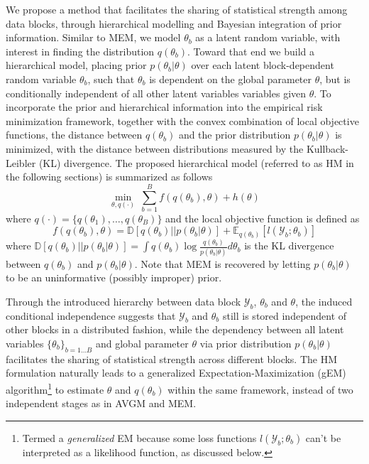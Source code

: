 \documentclass{article}
\newcommand{\1}[0]{\ensuremath{\boldsymbol{1}}\xspace}
\begin{document}

We propose a method that facilitates the sharing of statistical strength among data blocks, through hierarchical modelling and Bayesian integration of prior information. Similar to MEM, we model $\theta_b$ as a latent random variable, with interest in finding the distribution $q(\theta_b)$. Toward that end we build a hierarchical model, placing prior $p(\theta_b | \theta)$ over each latent block-dependent random variable $\theta_b$, such that $\theta_b$ is dependent on the global parameter $\theta$, but is conditionally independent of all other latent variables variables given $\theta$. To incorporate the prior and hierarchical information into the empirical risk minimization framework, together with the convex combination of local objective functions, the distance between $q(\theta_b)$ and the prior distribution $p(\theta_b|\theta)$ is minimized, with the distance between distributions measured by the Kullback-Leibler (KL) divergence. The proposed hierarchical model (referred to as HM in the following sections) is summarized as follows
\begin{equation}\label{hm}
\textstyle \min_{\theta, q(\cdot)} ~ \sum_{b=1}^B f(q(\theta_b), \theta) + h(\theta)
\end{equation}
where $q(\cdot) = \{q(\theta_1), \ldots, q(\theta_B)\}$ and the local objective function is defined as
\begin{equation}\label{local_obj}
\textstyle f(q(\theta_b), \theta)  = \mathbb{D}[q(\theta_b)||p(\theta_b|\theta)] + \mathbb{E}_{q(\theta_b)}[l(\mathcal{Y}_b; \theta_b)]
\end{equation}
where $\mathbb{D}[q(\theta_b)||p(\theta_b|\theta)] = \int q(\theta_b)\log\frac{q(\theta_b)}{p(\theta_b|\theta)}d\theta_b$ is the KL divergence between $q(\theta_b)$ and $p(\theta_b|\theta)$. Note that MEM is recovered by letting $p(\theta_b|\theta)$ to be an uninformative (possibly improper) prior. 

Through the introduced hierarchy between data block $\mathcal{Y}_b$, $\theta_b$ and $\theta$, the induced conditional independence suggests that $\mathcal{Y}_b$ and $\theta_b$ still is stored independent of other blocks in a distributed fashion, while the dependency between all latent variables $\{\theta_b\}_{b=1\ldots B}$ and global parameter $\theta$ via prior distribution $p(\theta_b|\theta)$ facilitates the sharing of statistical strength across different blocks. The HM formulation naturally leads to a generalized Expectation-Maximization (gEM) algorithm\footnote{Termed a \emph{generalized} EM because some loss functions $l(\mathcal{Y}_b; \theta_b)$ can't be interpreted as a likelihood function, as discussed below.} to estimate $\theta$ and $q(\theta_b)$ within the same framework, instead of two independent stages as in AVGM and MEM.
\end{document}
